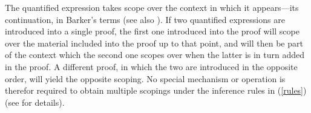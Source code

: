 \documentclass[output=paper,colorlinks,citecolor=brown]{langscibook}
\begin{document}
\begin{exe}
 \ex\label{someoneProof}
\end{exe}
The quantified expression takes scope over the context in which it
appears---its continuation, in Barker's terms \citeyearpar{Barker2002,Barker2004} (see also \citealt{barkershan2015}). If two quantified expressions are
introduced into a single proof, the first one introduced into the
proof will scope over the material included into the proof up to that
point, and will then be part of the context which the second one
scopes over when the latter is in turn added in the proof. A different
proof, in which the two are introduced in the opposite order, will
yield the opposite scoping. No special mechanism or operation is
therefor required to obtain multiple scopings under the inference
rules in (\ref{rules}) (see \citealt[Section~2.3]{kubotalevineBook} for
details).
\end{document}

